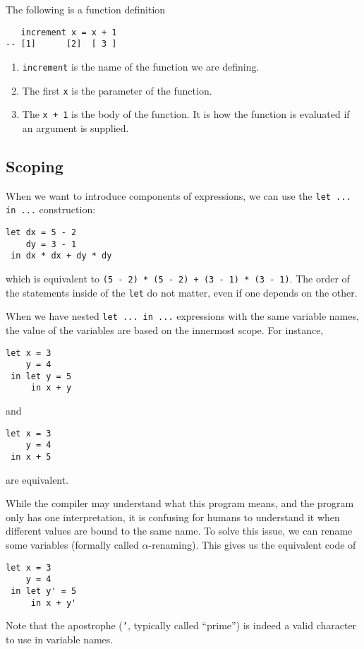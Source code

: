 \documentclass[class=scrartcl]{standalone}
\begin{document}
The following is a function definition
\begin{verbatim}
   increment x = x + 1
-- [1]      [2]  [ 3 ]
\end{verbatim}
\begin{enumerate}
  \item \texttt{increment} is the name of
        the function we are defining.
  \item The first \texttt{x} is the parameter of the function.
  \item The \texttt{x + 1} is the body of the function.
        It is how the function is evaluated if an argument is supplied.
\end{enumerate}

\subsection{Scoping}
When we want to introduce components of expressions,
we can use the \texttt{let ... in ...} construction: %
\begin{verbatim}
let dx = 5 - 2
    dy = 3 - 1
 in dx * dx + dy * dy
\end{verbatim}
which is equivalent to
\texttt{(5 - 2) * (5 - 2) + (3 - 1) * (3 - 1)}. %
The order of the statements inside of the \texttt{let}
do not matter, even if one depends on the other.

When we have nested \texttt{let ... in ...} expressions %
with the same variable names, the value of the variables are based on
the innermost scope.
For instance,
\begin{verbatim}
let x = 3
    y = 4
 in let y = 5
     in x + y
\end{verbatim}
and
\begin{verbatim}
let x = 3
    y = 4
 in x + 5
\end{verbatim}
are equivalent.

While the compiler may understand what this program means,
and the program only has one interpretation,
it is confusing for humans to understand it when different values
are bound to the same name.
To solve this issue, we can rename some variables
(formally called \(\alpha\)-renaming).
This gives us the equivalent code of
\begin{verbatim}
let x = 3
    y = 4
 in let y' = 5
     in x + y'
\end{verbatim}
Note that the apostrophe (\texttt{'}, typically called ``prime'')
is indeed a valid character to use in variable names.
\end{document}

